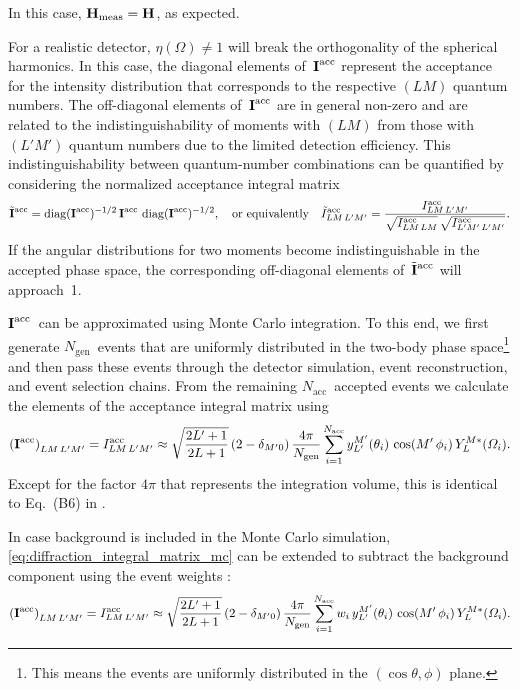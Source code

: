 In this case, $\bm{\mathrm{H}}_\text{meas} = \bm{\mathrm{H}}$, as expected.

For a realistic detector, $\eta(\Omega) \neq 1$ will break the
orthogonality of the spherical harmonics.  In this case, the diagonal
elements of~$\bm{\mathrm{I}}^\text{acc}$ represent the acceptance for the
intensity distribution that corresponds to the respective $(L M)$
quantum numbers.  The off-diagonal elements of~$\bm{\mathrm{I}}^\text{acc}$
are in general non-zero and are related to the indistinguishability of
moments with $(L M)$ from those with $(L' M')$ quantum numbers due to
the limited detection efficiency.  This indistinguishability between
quantum-number combinations can be quantified by considering the
normalized acceptance integral matrix
\begin{equation}
  \tilde{\bm{\mathrm{I}}}^\text{acc}
  = \operatorname{diag}(\bm{\mathrm{I}}^\text{acc})^{-1/2}\, \bm{\mathrm{I}}^\text{acc}\, \operatorname{diag}(\bm{\mathrm{I}}^\text{acc})^{-1/2},
  \quad\text{or equivalently}\quad
  \tilde{I}^\text{acc}_{L M\, L' M'}
  = \frac{I^\text{acc}_{L M\, L' M'}}{\sqrt{I^\text{acc}_{L M\, L M}}\, \sqrt{I^\text{acc}_{L' M'\, L' M'}}}.
\end{equation}
If the angular distributions for two moments become indistinguishable
in the accepted phase space, the corresponding off-diagonal elements
of~$\tilde{\bm{\mathrm{I}}}^\text{acc}$ will approach~1.

$\bm{\mathrm{I}}^\text{acc}$~can be approximated using Monte Carlo
integration.  To this end, we first generate $N_\text{gen}$~events
that are uniformly distributed in the two-body phase
space\footnote{This means the events are uniformly distributed in the
$(\cos\theta, \phi)$ plane.} and then pass these events through the
detector simulation, event reconstruction, and event selection chains.
From the remaining $N_\text{acc}$~accepted events we calculate the
elements of the acceptance integral matrix using
\begin{equation}
  \label{eq:diffraction_integral_matrix_mc}
  \rBrk{\mat{I}^\text{acc}}_{L M\, L' M'}
  = I^\text{acc}_{L M\, L' M'}
  \approx \sqrt{\frac{2 L' + 1}{2 L + 1}}\, (2 - \delta_{M' 0})\,
  \frac{4 \pi}{N_\text{gen}} \sum_{i = 1}^{N_\text{acc}} y_{L'}^{M'}(\theta_i)\, \cos(M'\, \phi_i)\, Y_L^{M *}(\Omega_i).
\end{equation}
Except for the factor $4 \pi$ that represents the integration volume,
this is identical to Eq.~(B6) in .

In case background is included in the Monte Carlo simulation,
\cref{eq:diffraction_integral_matrix_mc} can be extended to subtract the
background component using the event weights :
\begin{equation}
  \label{eq:diffraction_integral_matrix_mc_weighted}
  \rBrk{\mat{I}^\text{acc}}_{L M\, L' M'}
  = I^\text{acc}_{L M\, L' M'}
  \approx \sqrt{\frac{2 L' + 1}{2 L + 1}}\, (2 - \delta_{M' 0})\,
  \frac{4 \pi}{N_\text{gen}} \sum_{i = 1}^{N_\text{acc}} w_i\, y_{L'}^{M'}(\theta_i)\, \cos(M'\, \phi_i)\, Y_L^{M *}(\Omega_i).
\end{equation}

